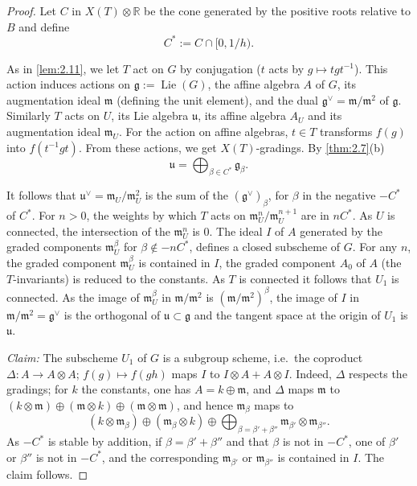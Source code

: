 \documentclass[11pt,a4paper]{article}
\theoremstyle{plain}
\theoremstyle{definition}
\DeclareMathOperator{\Lie}{Lie}
\newcommand{\RR}{\mathbb{R}}
\begin{document}
\begin{proof}
Let $C$ in $X(T) \otimes \RR$ be the cone generated by the positive roots relative to $B$ and define
\begin{equation} \label{eq:2.12.1}
C^* := C \cap [0, 1/h).
\end{equation}

As in \ref{lem:2.11}, we let $T$ act on $G$ by conjugation ($t$ acts by $g \mapsto tgt^{-1}$). This action induces actions on $\mathfrak{g} := \Lie(G)$, the affine algebra $A$ of $G$, its augmentation ideal $\mathfrak{m}$ (defining the unit element), and the dual $\mathfrak{g}^\vee = \mathfrak{m}/\mathfrak{m}^2$ of $\mathfrak{g}$. Similarly $T$ acts on $U$, its Lie algebra $\mathfrak{u}$, its affine algebra $A_U$ and its augmentation ideal $\mathfrak{m}_U$. For the action on affine algebras, $t \in T$ transforms $f(g)$ into $f(t^{-1}gt)$. From these actions, we get $X(T)$-gradings. By \ref{thm:2.7}(b)
\begin{equation} \label{eq:2.12.2}
\mathfrak{u} = \bigoplus_{\beta \in C^*} \mathfrak{g}_\beta.
\end{equation}

It follows that $\mathfrak{u}^\vee = \mathfrak{m}_U/\mathfrak{m}_U^2$ is the sum of the $(\mathfrak{g}^\vee)_\beta$, for $\beta$ in the negative $-C^*$ of $C^*$. For $n > 0$, the weights by which $T$ acts on $\mathfrak{m}_U^n/\mathfrak{m}_U^{n+1}$ are in $nC^*$. As $U$ is connected, the intersection of the $\mathfrak{m}_U^n$ is $0$. The ideal $I$ of $A$ generated by the graded components $\mathfrak{m}_U^\beta$ for $\beta \notin -nC^*$, defines a closed subscheme of $G$. For any $n$, the graded component $\mathfrak{m}_U^\beta$ is contained in $I$, the graded component $A_0$ of $A$ (the $T$-invariants) is reduced to the constants. As $T$ is connected it follows that $U_1$ is connected. As the image of $\mathfrak{m}_U^\beta$ in $\mathfrak{m}/\mathfrak{m}^2$ is $(\mathfrak{m}/\mathfrak{m}^2)^\beta$, the image of $I$ in $\mathfrak{m}/\mathfrak{m}^2 = \mathfrak{g}^\vee$ is the orthogonal of $\mathfrak{u} \subset \mathfrak{g}$ and the tangent space at the origin of $U_1$ is $\mathfrak{u}$.

\textit{Claim:} The subscheme $U_1$ of $G$ is a subgroup scheme, i.e.~the coproduct $\Delta : A \to A \otimes A$; $f(g) \mapsto f(gh)$ maps $I$ to $I \otimes A + A \otimes I$. Indeed, $\Delta$ respects the gradings; for $k$ the constants, one has $A = k \oplus \mathfrak{m}$, and $\Delta$ maps $\mathfrak{m}$ to $(k \otimes \mathfrak{m}) \oplus (\mathfrak{m} \otimes k) \oplus (\mathfrak{m} \otimes \mathfrak{m})$, and hence $\mathfrak{m}_\beta$ maps to
\begin{equation} \label{eq:2.12.3}
(k \otimes \mathfrak{m}_\beta) \oplus (\mathfrak{m}_\beta \otimes k) \oplus \bigoplus_{\beta = \beta' + \beta''} \mathfrak{m}_{\beta'} \otimes \mathfrak{m}_{\beta''}.
\end{equation}
As $-C^*$ is stable by addition, if $\beta = \beta' + \beta''$ and that $\beta$ is not in $-C^*$, one of $\beta'$ or $\beta''$ is not in $-C^*$, and the corresponding $\mathfrak{m}_{\beta'}$ or $\mathfrak{m}_{\beta''}$ is contained in $I$. The claim follows.


\end{proof}
\end{document}
